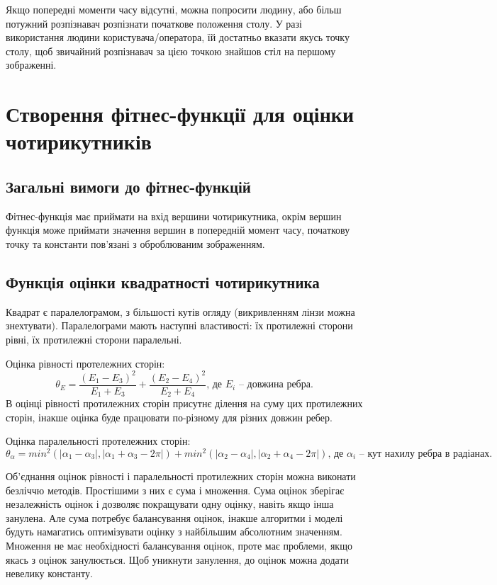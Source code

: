 \documentclass[a4paper,14pt]{report}
\begin{document}
Якщо попередні моменти часу відсутні, можна попросити людину, або більш потужний розпізнавач розпізнати початкове положення столу. 
У разі використання людини користувача/оператора, їй достатньо вказати якусь точку столу, щоб звичайний розпізнавач за цією точкою знайшов стіл на першому зображенні. 

\section{Створення фітнес-функції для оцінки чотирикутників}
\subsection{Загальні вимоги до фітнес-функцій}
Фітнес-функція має приймати на вхід вершини чотирикутника, окрім вершин функція може приймати значення вершин в попередній момент часу, початкову точку та константи пов'язані з оброблюваним зображенням.

\subsection{Функція оцінки квадратності чотирикутника}
Квадрат є паралелограмом, з більшості кутів огляду (викривленням лінзи можна знехтувати). 
Паралелограми мають наступні властивості: їх протилежні сторони рівні, їх протилежні сторони паралельні.

Оцінка рівності протележних сторін:
\[
\theta_E = \frac{(E_1-E_3)^2}{E_1+E_3} + \frac{(E_2-E_4)^2}{E_2+E_4}\text{, де }E_i\text{ -- довжина ребра.}
\]
В оцінці рівності протилежних сторін присутнє ділення на суму цих протилежних сторін, інакше оцінка буде працювати по-різному для різних довжин ребер.


Оцінка паралельності протележних сторін:
\[
\theta_\alpha = min^2(|\alpha_1-\alpha_3|, |\alpha_1+\alpha_3-2\pi|) + min^2(|\alpha_2-\alpha_4|, |\alpha_2+\alpha_4-2\pi|)\text{, де }\alpha_i\text{ -- кут нахилу ребра в радіанах.}
\]

Об'єднання оцінок рівності і паралельності протилежних сторін можна виконати безліччю методів. Простішими з них є сума і множення. 
Сума оцінок зберігає незалежність оцінок і дозволяє покращувати одну оцінку, навіть якщо інша занулена. Але сума потребує балансування оцінок, інакше алгоритми і моделі будуть намагатись оптимізувати оцінку з найбільшим абсолютним значенням. 
Множення не має необхідності балансування оцінок, проте має проблеми, якщо якась з оцінок занулюється. Щоб уникнути занулення, до оцінок можна додати невелику константу.
\end{document}
